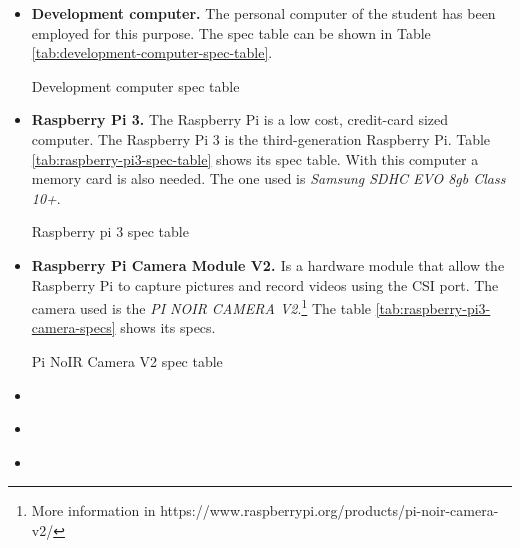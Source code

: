\begin{itemize}
	\item \textbf{Development computer.} The personal computer of the student has been employed for this purpose. The spec table can be shown in Table \ref{tab:development-computer-spec-table}.
	
	\begin{table}[hp]
		\centering
		{\small
			
		}
		\caption{Development computer spec table}
		\label{tab:development-computer-spec-table}
	\end{table}
	
	\item \textbf{Raspberry Pi 3.} The Raspberry Pi is a low cost, credit-card sized computer. The Raspberry Pi 3 is the third-generation Raspberry Pi. Table \ref{tab:raspberry-pi3-spec-table} shows its spec table. With this computer a memory card is also needed. The one used is \emph{Samsung SDHC EVO 8gb Class 10+}.
	
	\begin{table}[hp]
		\centering
		{\small
			
		}
		\caption{Raspberry pi 3 spec table}
		\label{tab:raspberry-pi3-spec-table}
	\end{table}
	
	\item \textbf{Raspberry Pi Camera Module V2. \cite{PiCameraDoc}} Is a hardware module that allow the Raspberry Pi to capture pictures and record videos using the CSI port. The camera used is the \emph{PI NOIR CAMERA V2}.\footnote{More information in https://www.raspberrypi.org/products/pi-noir-camera-v2/} The table \ref{tab:raspberry-pi3-camera-specs} shows its specs. \label{itm:Pi-camera-module-v2}
	
	\begin{table}[hp]
		\centering
		{\small
			
		}
		\caption{Pi NoIR Camera V2 spec table}
		\label{tab:raspberry-pi3-camera-specs}
	\end{table}
	
	\item \textbf{}
	
	
	
	\item \textbf{}
	
	
	
	\item \textbf{}
	
	
	
\end{itemize} 



